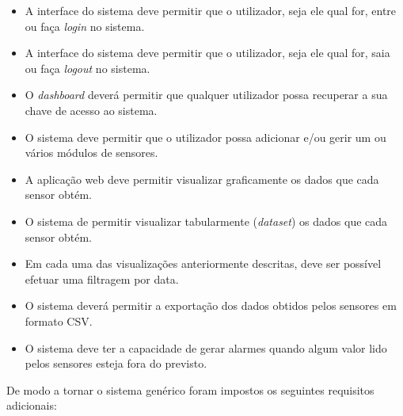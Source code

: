 \begin{itemize}
	\item A interface do sistema deve permitir que o utilizador, seja ele qual for, entre ou faça \textit{login} no sistema. 
	
	\item A interface do sistema deve permitir que o utilizador, seja ele qual for, saia ou faça \textit{logout} no sistema.
	
	\item O \textit{dashboard} deverá permitir que qualquer utilizador possa recuperar a sua chave de acesso ao sistema.

	\item O sistema deve permitir que o utilizador possa adicionar e/ou gerir um ou vários módulos de sensores. 
	
	\item A aplicação web deve permitir visualizar graficamente os dados que cada sensor obtém. 
		
	\item O sistema de permitir visualizar tabularmente (\textit{dataset}) os dados que cada sensor obtém. 
	
	\item Em cada uma das visualizações anteriormente descritas, deve ser possível efetuar uma filtragem por data.
	
	\item O sistema deverá permitir a exportação dos dados obtidos pelos sensores  em formato \ac{CSV}. 
		
	\item O sistema deve ter a capacidade de gerar alarmes quando algum valor lido pelos sensores esteja fora do previsto. 
	
\end{itemize}


De modo a tornar o sistema genérico foram impostos os seguintes requisitos adicionais: 


